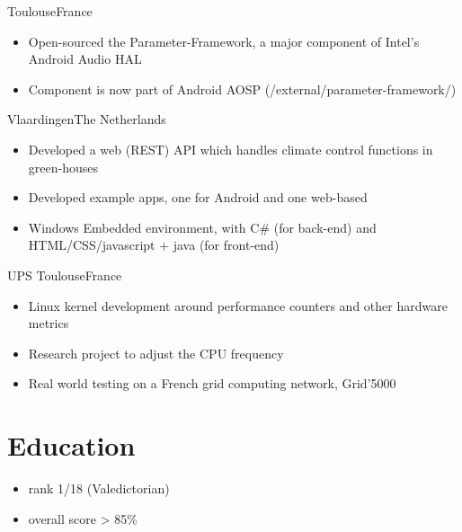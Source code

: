 \documentclass[a4paper,11pt,sans]{moderncv}
\begin{document}
{Toulouse}{France}
{
  \begin{itemize}
    \item Open-sourced the Parameter-Framework, a major component of Intel's Android Audio HAL
    \item Component is now part of Android AOSP (/external/parameter-framework/)
  \end{itemize}
}

{Vlaardingen}{The Netherlands}
{
  \begin{itemize}
  \item Developed a web (REST) API which handles climate control functions in green-houses
  \item Developed example apps, one for Android and one web-based
  \item Windows Embedded environment, with C\# (for back-end) and HTML/CSS/javascript + java (for front-end)
  \end{itemize}
}

{UPS Toulouse}{France}
{
  \begin{itemize}
    \item Linux kernel development around performance counters and other hardware metrics
    \item Research project to adjust the CPU frequency
    \item Real world testing on a French grid computing network, Grid'5000
  \end{itemize}
}


\section{Education}
{
  \begin{itemize}
  \item rank 1/18 (Valedictorian)
  \item overall score > 85\%
  \end{itemize}
}
\end{document}
